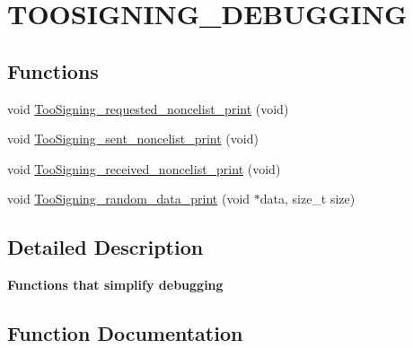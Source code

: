\hypertarget{group__TOOSIGNING__DEBUGGING}{}\section{T\+O\+O\+S\+I\+G\+N\+I\+N\+G\+\_\+\+D\+E\+B\+U\+G\+G\+I\+NG}
\label{group__TOOSIGNING__DEBUGGING}
\subsection*{Functions}
\begin{DoxyCompactItemize}
\item 
void \hyperlink{group__TOOSIGNING__DEBUGGING_gabb54a5e4968d69e35d665869d5c6588f}{Too\+Signing\+\_\+requested\+\_\+noncelist\+\_\+print} (void)
\item 
void \hyperlink{group__TOOSIGNING__DEBUGGING_gab35891e0905f1ddec2ff8b649f63d5e5}{Too\+Signing\+\_\+sent\+\_\+noncelist\+\_\+print} (void)
\item 
void \hyperlink{group__TOOSIGNING__DEBUGGING_gaba98f230fad779da673a83370ad7de5d}{Too\+Signing\+\_\+received\+\_\+noncelist\+\_\+print} (void)
\item 
void \hyperlink{group__TOOSIGNING__DEBUGGING_ga73839f8ecb81bdbb2e6c36adab498dac}{Too\+Signing\+\_\+random\+\_\+data\+\_\+print} (void $\ast$data, size\+\_\+t size)
\end{DoxyCompactItemize}


\subsection{Detailed Description}
{\bfseries Functions that simplify debugging} 

\subsection{Function Documentation}
